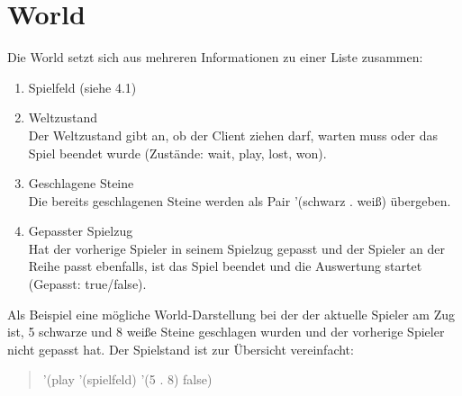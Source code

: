 \documentclass[a4paper]{scrreprt}
\begin{document}
\section{World}
Die World setzt sich aus mehreren Informationen zu einer Liste zusammen:

\begin{enumerate}
\item Spielfeld (siehe 4.1)
\item Weltzustand\\
Der Weltzustand gibt an, ob der Client ziehen darf, warten muss oder das Spiel beendet wurde (Zustände: wait, play, lost, won).
\item Geschlagene Steine\\
Die bereits geschlagenen Steine werden als Pair '(schwarz . weiß) übergeben.
\item Gepasster Spielzug\\
Hat der vorherige Spieler in seinem Spielzug gepasst und der Spieler an der Reihe passt ebenfalls, ist das Spiel beendet und die Auswertung startet (Gepasst: true/false). 
\end{enumerate}
Als Beispiel eine mögliche World-Darstellung bei der der aktuelle Spieler am Zug ist, 5 schwarze und 8 weiße Steine geschlagen wurden und der vorherige Spieler nicht gepasst hat. Der Spielstand ist zur Übersicht vereinfacht:
\begin{quotation}
 '(play '(spielfeld) '(5 . 8) false)
\end{quotation}
\end{document}
